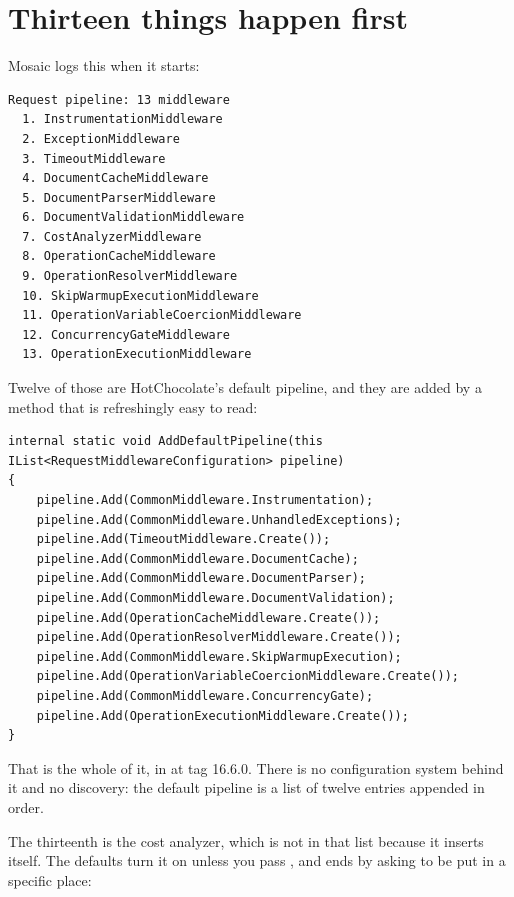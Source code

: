 \section{Thirteen things happen first}
\label{sec:ch03-pipeline}

Mosaic logs this when it starts:

\begin{verbatim}
Request pipeline: 13 middleware
  1. InstrumentationMiddleware
  2. ExceptionMiddleware
  3. TimeoutMiddleware
  4. DocumentCacheMiddleware
  5. DocumentParserMiddleware
  6. DocumentValidationMiddleware
  7. CostAnalyzerMiddleware
  8. OperationCacheMiddleware
  9. OperationResolverMiddleware
  10. SkipWarmupExecutionMiddleware
  11. OperationVariableCoercionMiddleware
  12. ConcurrencyGateMiddleware
  13. OperationExecutionMiddleware
\end{verbatim}

%
Twelve of those are HotChocolate's default pipeline, and they are added by a
method that is refreshingly easy to read:

\begin{verbatim}
internal static void AddDefaultPipeline(this IList<RequestMiddlewareConfiguration> pipeline)
{
    pipeline.Add(CommonMiddleware.Instrumentation);
    pipeline.Add(CommonMiddleware.UnhandledExceptions);
    pipeline.Add(TimeoutMiddleware.Create());
    pipeline.Add(CommonMiddleware.DocumentCache);
    pipeline.Add(CommonMiddleware.DocumentParser);
    pipeline.Add(CommonMiddleware.DocumentValidation);
    pipeline.Add(OperationCacheMiddleware.Create());
    pipeline.Add(OperationResolverMiddleware.Create());
    pipeline.Add(CommonMiddleware.SkipWarmupExecution);
    pipeline.Add(OperationVariableCoercionMiddleware.Create());
    pipeline.Add(CommonMiddleware.ConcurrencyGate);
    pipeline.Add(OperationExecutionMiddleware.Create());
}
\end{verbatim}

That is the whole of it, in 
at tag 16.6.0. There is no configuration system behind it and no discovery: the
default pipeline is a list of twelve entries appended in order.

%
The thirteenth is the cost analyzer, which is not in that list because it
inserts itself. The defaults turn it on unless you pass
, and  ends by asking to be
put in a specific place:

